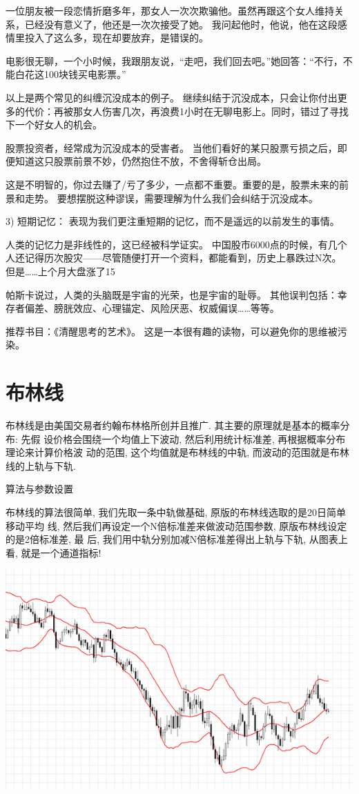 一位朋友被一段恋情折磨多年，那女人一次次欺骗他。虽然再跟这个女人维持关系，已经没有意义了，他还是一次次接受了她。
我问起他时，他说，他在这段感情里投入了这么多，现在却要放弃，是错误的。

电影很无聊，一个小时候，我跟朋友说，“走吧，我们回去吧。”她回答：“不行，不能白花这100块钱买电影票。”

以上是两个常见的纠缠沉没成本的例子。
继续纠结于沉没成本，只会让你付出更多的代价：再被那女人伤害几次，再浪费1小时在无聊电影上。同时，错过了寻找下一个好女人的机会。

股票投资者，经常成为沉没成本的受害者。
当他们看好的某只股票亏损之后，即便知道这只股票前景不妙，仍然抱住不放，不舍得斩仓出局。

这是不明智的，你过去赚了/亏了多少，一点都不重要。重要的是，股票未来的前景和走势。
要想摆脱这种谬误，需要理解为什么我们会纠结于沉没成本。

3) 短期记忆：
表现为我们更注重短期的记忆，而不是遥远的以前发生的事情。

人类的记忆力是非线性的，这已经被科学证实。
中国股市6000点的时候，有几个人还记得历次股灾——尽管随便打开一个资料，都能看到，历史上暴跌过N次。
但是……上个月大盘涨了15%

帕斯卡说过，人类的头脑既是宇宙的光荣，也是宇宙的耻辱。
其他误判包括：幸存者偏差、膀胱效应、心理锚定、风险厌恶、权威偏误……等等。

推荐书目：《清醒思考的艺术》。
这是一本很有趣的读物，可以避免你的思维被污染。


\section{布林线}

布林线是由美国交易者约翰布林格所创并且推广. 其主要的原理就是基本的概率分布: 先假
设价格会围绕一个均值上下波动, 然后利用统计标准差, 再根据概率分布理论来计算价格波
动的范围, 这个均值就是布林线的中轨, 而波动的范围就是布林线的上轨与下轨.

算法与参数设置

布林线的算法很简单, 我们先取一条中轨做基础, 原版的布林线选取的是20日简单移动平均
线, 然后我们再设定一个N倍标准差来做波动范围参数, 原版布林线设定的是2倍标准差, 最
后, 我们用中轨分别加减N倍标准差得出上轨与下轨, 从图表上看, 就是一个通道指标!

\includegraphics[width=\textwidth]{figure/boll1.png}

